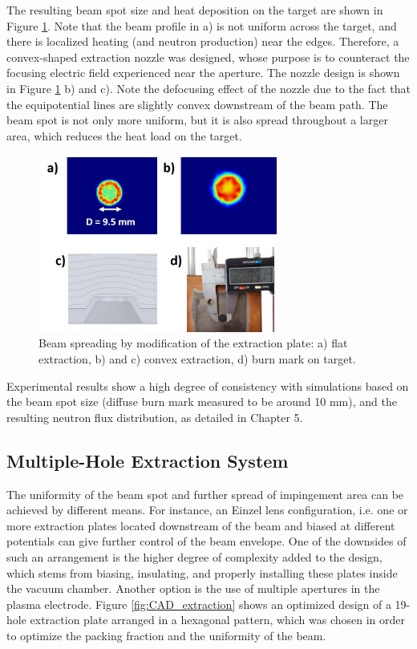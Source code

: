 \documentclass[review]{elsarticle}
\begin{document}
The resulting beam spot size and heat deposition on the target are shown in Figure \ref{fig:beam_spot2}. Note that the beam profile in a) is not uniform across the target, and there is localized heating (and neutron production) near the edges. Therefore, a convex-shaped extraction nozzle was designed, whose purpose is to counteract the focusing electric field experienced near the aperture. The nozzle design is shown in Figure \ref{fig:beam_spot2} b) and c). Note the defocusing effect of the nozzle due to the fact that the equipotential lines are slightly convex downstream of the beam path. The beam spot is not only more uniform, but it is also spread throughout a larger area, which reduces the heat load on the target.

\begin{figure}
	\centering
	\includegraphics[width=0.7\textwidth]{pics/beam_spot2}
	\caption{Beam spreading by modification of the extraction plate: a) flat extraction, b) and c) convex extraction, d) burn mark on target.}
	\label{fig:beam_spot2}
\end{figure}

Experimental results show a high degree of consistency with simulations based on the beam spot size (diffuse burn mark measured to be around 10 mm), and the resulting neutron flux distribution, as detailed in Chapter 5. 


\subsection{Multiple-Hole Extraction System}

The uniformity of the beam spot and further spread of impingement area can be achieved by different means. For instance, an Einzel lens configuration, i.e. one or more extraction plates located downstream of the beam and biased at different potentials can give further control of the beam envelope. One of the downsides of such an arrangement is the higher degree of complexity added to the design, which stems from biasing, insulating, and properly installing these plates inside the vacuum chamber. Another option is the use of multiple apertures in the plasma electrode. Figure \ref{fig:CAD_extraction} shows an optimized design of a 19-hole extraction plate arranged in a hexagonal pattern, which was chosen in order to optimize the packing fraction and the uniformity of the beam.
\end{document}
